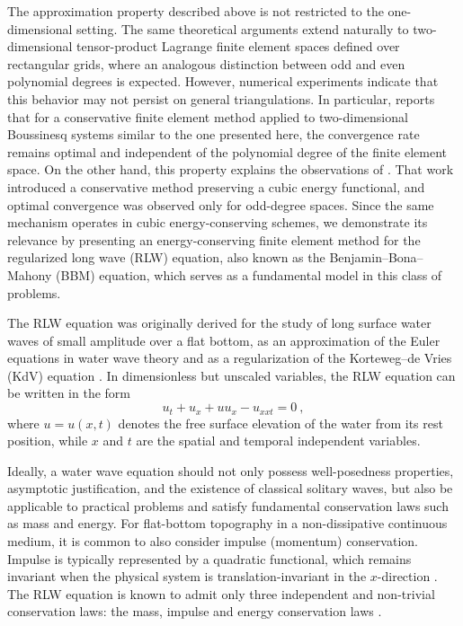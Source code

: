 \documentclass{amsart}
\begin{document}
The approximation property described above is not restricted to the one-dimensi\-onal setting. The same theoretical arguments extend naturally to two-dimensi\-onal tensor-product Lagrange finite element spaces defined over rectangular grids, where an analogous distinction between odd and even polynomial degrees is expected. However, numerical experiments indicate that this behavior may not persist on general triangulations. In particular, \cite{AM2025} reports that for a conservative finite element method applied to two-dimensional Boussinesq systems similar to the one presented here, the convergence rate remains optimal and independent of the polynomial degree of the finite element space. On the other hand, this property explains the observations of \cite{MRKS2021}. That work introduced a conservative method preserving a cubic energy functional, and optimal convergence was observed only for odd-degree spaces. Since the same mechanism operates in cubic energy-conserving schemes, we demonstrate its relevance by presenting an energy-conserving finite element method for the regularized long wave (RLW) equation, also known as the Benjamin--Bona--Mahony (BBM) equation, which serves as a fundamental model in this class of problems.


The RLW equation was originally derived for the study of long surface water waves of small amplitude over a flat bottom, as an approximation of the Euler equations in water wave theory and as a regularization of the Korteweg--de Vries (KdV) equation \cite{BBM1972,Pere1966,KDV1895,BS1975}. In dimensionless but unscaled variables, the RLW equation can be written in the form
\begin{equation}\label{eq:bbm}
u_t + u_x + u u_x - u_{xxt} = 0\ ,
\end{equation}
where $u=u(x,t)$ denotes the free surface elevation of the water from its rest position, while $x$ and $t$ are the spatial and temporal independent variables.

Ideally, a water wave equation should not only possess well-posedness properties, asymptotic justification, and the existence of classical solitary waves, but also be applicable to practical problems and satisfy fundamental conservation laws such as mass and energy. For flat-bottom topography in a non-dissipative continuous medium, it is common to also consider impulse (momentum) conservation. Impulse is typically represented by a quadratic functional, which remains invariant when the physical system is translation-invariant in the $x$-direction \cite{Benjamin1984}. The RLW equation is known to admit only three independent and non-trivial conservation laws: the mass, impulse and energy conservation laws \cite{Olver1979}.  
\end{document}
